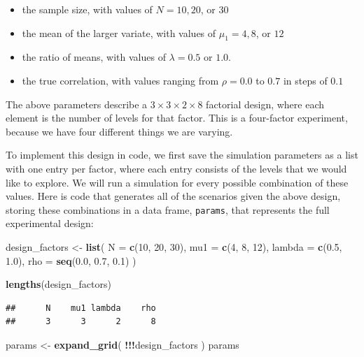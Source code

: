 \documentclass[
]{book}
\newenvironment{Shaded}{\begin{snugshade}}{\end{snugshade}}
\newcommand{\AttributeTok}[1]{\textcolor[rgb]{0.13,0.29,0.53}{#1}}
\newcommand{\DecValTok}[1]{\textcolor[rgb]{0.00,0.00,0.81}{#1}}
\newcommand{\FloatTok}[1]{\textcolor[rgb]{0.00,0.00,0.81}{#1}}
\newcommand{\FunctionTok}[1]{\textcolor[rgb]{0.13,0.29,0.53}{\textbf{#1}}}
\newcommand{\NormalTok}[1]{#1}
\newcommand{\OtherTok}[1]{\textcolor[rgb]{0.56,0.35,0.01}{#1}}
\newcommand{\SpecialCharTok}[1]{\textcolor[rgb]{0.81,0.36,0.00}{\textbf{#1}}}
\providecommand{\tightlist}{%
  \setlength{\itemsep}{0pt}\setlength{\parskip}{0pt}}
\begin{document}
\begin{itemize}
\tightlist
\item
  the sample size, with values of \(N = 10, 20\), or \(30\)
\item
  the mean of the larger variate, with values of \(\mu_1 = 4, 8\), or \(12\)
\item
  the ratio of means, with values of \(\lambda = 0.5\) or \(1.0\).
\item
  the true correlation, with values ranging from \(\rho = 0.0\) to \(0.7\) in steps of \(0.1\)
\end{itemize}

The above parameters describe a \(3 \times 3 \times 2 \times 8\) factorial design, where each element is the number of levels for that factor. This is a four-factor experiment, because we have four different things we are varying.

To implement this design in code, we first save the simulation parameters as a list with one entry per factor, where each entry consists of the levels that we would like to explore.
We will run a simulation for every possible combination of these values.
Here is code that generates all of the scenarios given the above design, storing these combinations in a data frame, \texttt{params}, that represents the full experimental design:

\begin{Shaded}
\begin{Highlighting}[]
\NormalTok{design\_factors }\OtherTok{\textless{}{-}} \FunctionTok{list}\NormalTok{(}
  \AttributeTok{N =} \FunctionTok{c}\NormalTok{(}\DecValTok{10}\NormalTok{, }\DecValTok{20}\NormalTok{, }\DecValTok{30}\NormalTok{),}
  \AttributeTok{mu1 =} \FunctionTok{c}\NormalTok{(}\DecValTok{4}\NormalTok{, }\DecValTok{8}\NormalTok{, }\DecValTok{12}\NormalTok{),}
  \AttributeTok{lambda =} \FunctionTok{c}\NormalTok{(}\FloatTok{0.5}\NormalTok{, }\FloatTok{1.0}\NormalTok{),}
  \AttributeTok{rho =} \FunctionTok{seq}\NormalTok{(}\FloatTok{0.0}\NormalTok{, }\FloatTok{0.7}\NormalTok{, }\FloatTok{0.1}\NormalTok{)}
\NormalTok{)}

\FunctionTok{lengths}\NormalTok{(design\_factors)}
\end{Highlighting}
\end{Shaded}

\begin{verbatim}
##      N    mu1 lambda    rho 
##      3      3      2      8
\end{verbatim}

\begin{Shaded}
\begin{Highlighting}[]
\NormalTok{params }\OtherTok{\textless{}{-}} \FunctionTok{expand\_grid}\NormalTok{( }\SpecialCharTok{!!!}\NormalTok{design\_factors )}
\NormalTok{params}
\end{Highlighting}
\end{Shaded}
\end{document}
